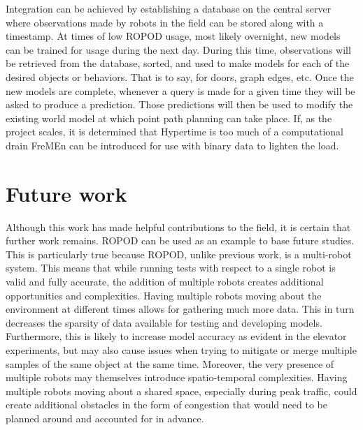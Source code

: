     Integration can be achieved by establishing a database on the central server
    where observations made by robots in the field can be stored along
    with a timestamp. At times of low ROPOD usage, most likely overnight, new
    models can be trained for usage during the next day. During this time,
    observations will be retrieved from the database, sorted, and used to make
    models for each of the desired objects or behaviors. That is to say, for
    doors, graph edges, etc. Once the new models are complete, whenever a query is
    made for a given time they will be asked to produce a prediction.
    Those predictions will then be used to modify the existing world model at
    which point path planning can take place. If, as the project scales, it is
    determined that Hypertime is too much of a computational drain FreMEn
    can be introduced for use with binary data to lighten the load. \\


    \section{ Future work }

    Although this work has made helpful contributions to the field, it is
    certain that further work remains. ROPOD can be used as an example
    to base future studies. This is particularly true because ROPOD, unlike previous work, is a multi-robot
    system. This means that while running tests with respect to a single robot
    is valid and fully accurate, the addition of multiple robots creates
    additional opportunities and complexities. Having multiple robots moving about
    the environment at different times allows for gathering much
    more data. This in turn decreases the sparsity of data
    available for testing and developing models. Furthermore, this is likely to increase model accuracy as evident in the
    elevator experiments, but may also cause issues when trying to mitigate
    or merge multiple samples of the same object at the same time. Moreover,
    the very presence of multiple robots may themselves introduce spatio-temporal
    complexities. Having multiple robots moving about a shared
    space, especially during peak traffic, could create additional obstacles
    in the form of congestion that would need to be planned around
    and accounted for in advance. \\

